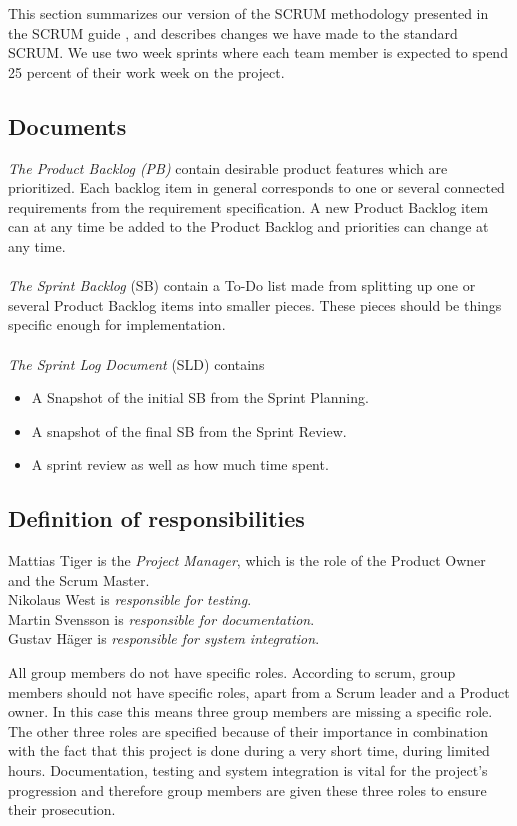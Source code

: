 
This section summarizes our version of the SCRUM methodology presented in the SCRUM guide \cite{scrumGuide}, and describes changes we have made to the standard SCRUM. We use two week sprints where each team member is expected to spend 25 percent of their work week on the project.   

\subsection{Documents}
\emph{The Product Backlog (PB)} contain desirable product features which are prioritized. Each backlog item in general corresponds to one or several connected requirements from the requirement specification.
A new Product Backlog item can at any time be added to the Product Backlog and priorities can change at any time. \\
\\
\emph{The Sprint Backlog} (SB) contain a To-Do list made from splitting up one or several Product Backlog items into smaller pieces. These pieces should be things specific enough for implementation. \\
\\
\emph{The Sprint Log Document} (SLD) contains
\begin{itemize}
  \item A Snapshot of the initial SB from the Sprint Planning.
  \item A snapshot of the final SB from the Sprint Review.
  \item A sprint review as well as how much time spent.
\end{itemize} 

\subsection{Definition of responsibilities}
Mattias Tiger is the \emph{Project Manager}, which is the role of the Product Owner and the Scrum Master.\\
Nikolaus West is \emph{responsible for testing}.\\
Martin Svensson is \emph{responsible for documentation}.\\
Gustav Häger is \emph{responsible for system integration}. 

All group members do not have specific roles. According to scrum, group members should not have specific roles, apart from a Scrum leader and a Product owner.  In this case this means three group members are missing a specific role. The other three  roles are specified because of their importance in combination with the fact that this project is done during a very short time, during limited hours.  Documentation, testing and system integration is vital for the project’s progression and therefore group members are given these three roles to ensure their prosecution.  

